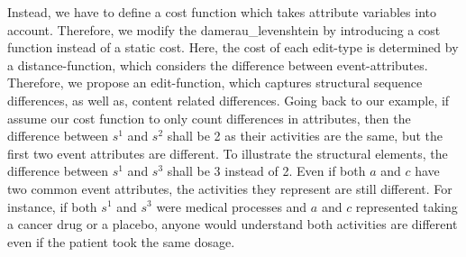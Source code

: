 \documentclass[./../../paper.tex]{subfiles}
\begin{document}
Instead, we have to define a cost function which takes attribute variables into account. Therefore, we modify the \gls{damerau_levenshtein} by introducing a cost function instead of a static cost. Here, the cost of each edit-type is determined by a distance-function, which considers the difference between event-attributes. Therefore, we propose an edit-function, which captures structural sequence differences, as well as, content related differences. Going back to our example, if assume our cost function to only count differences in attributes, then the difference between $s^1$ and $s^2$ shall be 2 as their activities are the same, but the first two event attributes are different. To illustrate the structural elements, the difference between $s^1$ and $s^3$ shall be 3 instead of 2. Even if both $a$ and $c$ have two common event attributes, the activities they represent are still different. For instance, if both $s^1$ and $s^3$ were medical processes and $a$ and $c$ represented taking a cancer drug or a placebo, anyone would understand both activities are different even if the patient took the same dosage.

\end{document}
